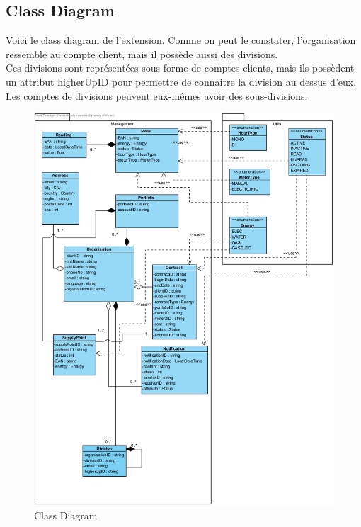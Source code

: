 \documentclass{report}
\begin{document}
\subsection{Class Diagram}
Voici le class diagram de l'extension. Comme on peut le constater, l'organisation ressemble au compte client, mais il possède aussi des divisions.\\ Ces divisions sont représentées sous forme de comptes clients, mais ils possèdent un attribut higherUpID pour permettre de connaitre la division au dessus d'eux. Les comptes de divisions peuvent eux-mêmes avoir des sous-divisions.
\begin{figure}[h!t]
	\centering
	\includegraphics[width=1.3\textwidth]{GL}
	\caption{Class Diagram}
	\label{fig:ClassDiagram}
\end{figure}
\end{document}
